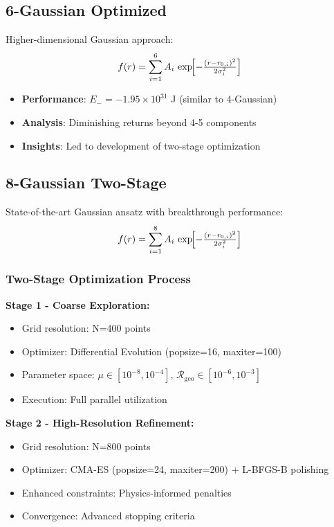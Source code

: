 \documentclass[12pt]{article}
\begin{document}
\subsection{6-Gaussian Optimized}
Higher-dimensional Gaussian approach:
\[
  f(r) = \sum_{i=1}^6 A_i\,\exp\!\Bigl[-\tfrac{(r - r_{0,i})^2}{2\sigma_i^2}\Bigr]
\]

\begin{itemize}
\item \textbf{Performance}: $E_- = -1.95\times10^{31}$ J (similar to 4-Gaussian)
\item \textbf{Analysis}: Diminishing returns beyond 4-5 components
\item \textbf{Insights}: Led to development of two-stage optimization
\end{itemize}

\subsection{8-Gaussian Two-Stage}
State-of-the-art Gaussian ansatz with breakthrough performance:
\[
  f(r) = \sum_{i=1}^8 A_i\,\exp\!\Bigl[-\tfrac{(r - r_{0,i})^2}{2\sigma_i^2}\Bigr]
\]

\subsubsection{Two-Stage Optimization Process}

\textbf{Stage 1 - Coarse Exploration:}
\begin{itemize}
\item Grid resolution: N=400 points
\item Optimizer: Differential Evolution (popsize=16, maxiter=100)
\item Parameter space: $\mu \in [10^{-8}, 10^{-4}]$, $\mathcal{R}_{\text{geo}} \in [10^{-6}, 10^{-3}]$
\item Execution: Full parallel utilization
\end{itemize}

\textbf{Stage 2 - High-Resolution Refinement:}
\begin{itemize}
\item Grid resolution: N=800 points
\item Optimizer: CMA-ES (popsize=24, maxiter=200) + L-BFGS-B polishing
\item Enhanced constraints: Physics-informed penalties
\item Convergence: Advanced stopping criteria
\end{itemize}
\end{document}
